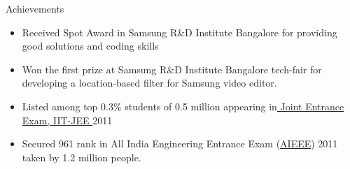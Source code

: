 \documentclass{resume} %
\begin{document}
\pagebreak 
\begin{rSection}{Achievements}

\begin{itemize}[leftmargin=*]
\itemsep -0.5em 
\item Received Spot Award in Samsung R\&D Institute Bangalore for providing good solutions and coding skills
\item Won the first prize at Samsung  R\&D Institute Bangalore tech-fair for developing a location-based filter for Samsung video editor.
\item Listed among top 0.3\% students of 0.5 million appearing in\href{https://en.wikipedia.org/wiki/Joint_Entrance_Examination}{ Joint Entrance Exam, IIT-JEE }
2011
\item Secured 961 rank in All India Engineering Entrance Exam (\href{https://en.wikipedia.org/wiki/Joint_Entrance_Examination_\%E2\%80\%93_Main}{AIEEE}) 2011 taken by 1.2 million people.


\end{itemize}
\end{rSection}
\vspace*{-1.5mm}

\end{document}
